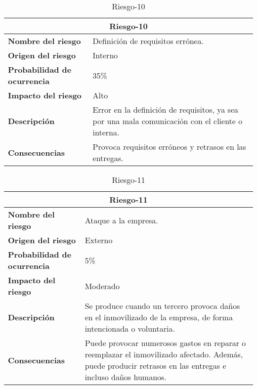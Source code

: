 \begin{table}[H]
\begin{center}
\begin{tabular}{p{} p{7cm}}
\multicolumn{2}{c}{\textbf{Riesgo-10} } \\
\hline \hline
\textbf{Nombre del riesgo} & Definición de requisitos errónea. \\
\hline
\textbf{Origen del riesgo} & Interno\\
\hline
\textbf{Probabilidad de ocurrencia} &   35\% \\
\hline
\textbf{Impacto del riesgo} &  Alto \\
\hline
\textbf{Descripción} &  Error en la definición de requisitos, ya sea por una mala comunicación con el cliente o interna. \\
\hline
\textbf{Consecuencias} &  Provoca requisitos erróneos y retrasos en las entregas. \\
\hline
\end{tabular}
\caption{Riesgo-10}
\label{tab:Riesgo-10}
\end{center}
\end{table}

\begin{table}[H]
\begin{center}
\begin{tabular}{p{} p{7cm}}
\multicolumn{2}{c}{\textbf{Riesgo-11} } \\
\hline \hline
\textbf{Nombre del riesgo} & Ataque a la empresa. \\
\hline
\textbf{Origen del riesgo} & Externo\\
\hline
\textbf{Probabilidad de ocurrencia} & 5\%  \\
\hline
\textbf{Impacto del riesgo} & Moderado\\
\hline
\textbf{Descripción} &  Se produce cuando un tercero provoca daños en el inmovilizado de la empresa, de forma intencionada o voluntaria. \\
\hline
\textbf{Consecuencias} &  Puede provocar numerosos gastos en reparar o reemplazar el inmovilizado afectado. Además, puede producir retrasos en las entregas e incluso daños humanos. \\
\hline
\end{tabular}
\caption{Riesgo-11}
\label{tab:Riesgo-11}
\end{center}
\end{table}

